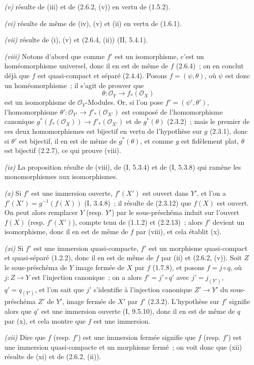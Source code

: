 \emph{(v)} résulte de (iii) et de (2.6.2, (v)) en vertu de (1.5.2).

\emph{(vi)} résulte de même de (iv), (v) et (ii) en vertu de (1.6.1).

\emph{(vii)} résulte de (i), (v) et (2.6.4, (ii)) (II, 5.4.1).

\emph{(viii)} Notons d'abord que comme $f'$ est un isomorphisme, c'est un
homéomorphisme universel, donc il en est de même de $f$ (2.6.4)~; on en
conclut déjà que $f$ est quasi-compact et séparé (2.4.4). Posons
$f=(\psi,\theta)$, où $\psi$ est donc un homéomorphisme~; il s'agit de
prouver que
\[
\theta:\mathcal O_Y\longrightarrow f_*(\mathcal O_X)
\]
est un isomorphisme de $\mathcal O_Y$-Modules. Or, si l'on pose
$f'=(\psi',\theta')$, l'homomorphisme
$\theta':\mathcal O_{Y'}\to f'_*(\mathcal O_{X'})$ est composé de
l'homomorphisme canonique
$g^*(f_*(\mathcal O_X))\to f'_*(\mathcal O_{X'})$ et de $g^*(\theta)$
(2.3.2)~; mais le premier de ces deux homomorphismes est bijectif en vertu de
l'hypothèse sur $g$ (2.3.1), donc si $\theta'$ est bijectif,
il en est de même de $g^*(\theta)$, et comme $g$ est fidèlement plat,
$\theta$ est bijectif (2.2.7), ce qui prouve (viii).

\emph{(ix)} La proposition résulte de (viii), de (I, 5.3.4) et de (I, 5.3.8)
qui ramène les monomorphismes aux isomorphismes.

\emph{(x)} Si $f'$ est une immersion ouverte, $f'(X')$ est ouvert dans $Y'$,
et l'on a $f'(X')=g^{-1}(f(X))$ (I, 3.4.8)~; il résulte de (2.3.12) que
$f(X)$ est ouvert. On peut alors remplacer $Y$ (resp. $Y'$) par le
sous-préschéma induit sur l'ouvert $f(X)$ (resp. $f'(X')$), compte tenu de
(1.1.2) et (2.2.13)~; alors $f'$ devient un isomorphisme, donc il en est de
même de $f$ par (viii), et cela établit (x).

\emph{(xi)} Si $f'$ est une immersion quasi-compacte, $f'$ est un morphisme
quasi-compact et quasi-séparé (1.2.2), donc il en est de même de $f$ par (ii)
et (2.6.2, (v)). Soit $Z$ le sous-préschéma de $Y$ image fermée de $X$ par
$f$ (1.7.8), et posons $f=j\circ q$, où $j:Z\to Y$ est l'injection
canonique~; on a alors $f'=j'\circ q'$ avec $j'=j_{(Y')}$,
$q'=q_{(Y')}$, et l'on sait que $j'$ s'identifie à l'injection canonique
$Z'\to Y'$ du sous-préschéma $Z'$ de $Y'$, image fermée de $X'$ par $f'$
(2.3.2). L'hypothèse sur $f'$ signifie alors que $q'$ est une immersion
ouverte (I, 9.5.10), donc il en est de même de $q$ par (x), et cela montre
que $f$ est une immersion.

\emph{(xii)} Dire que $f$ (resp. $f'$) est une immersion fermée signifie que
$f$ (resp. $f'$) est une immersion quasi-compacte et un morphisme fermé~; on
voit donc que (xii) résulte de (xi) et de (2.6.2, (ii)).


